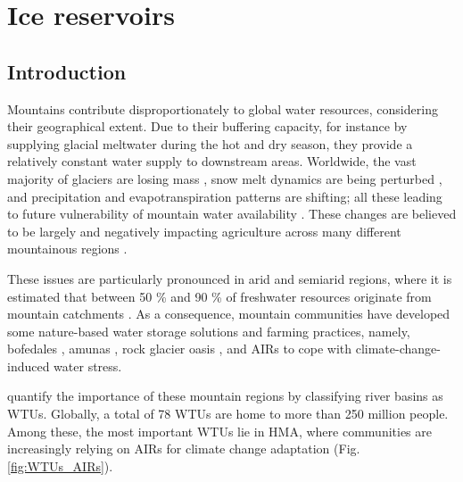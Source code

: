 \chapter{Ice reservoirs}



\section{Introduction}

Mountains contribute disproportionately to global water resources, considering their geographical extent.
Due to their buffering capacity, for instance by supplying glacial meltwater during the hot and dry season,
they provide a relatively constant water supply to downstream areas. Worldwide, the vast majority of glaciers
are losing mass \citep{zempGlobalGlacierMass2019a}, snow melt dynamics are being perturbed
\citep{mukhopadhyayReevaluationSnowmeltGlacial2015, hammondGlobalSnowZone2018}, and precipitation and
evapotranspiration patterns are shifting; all these leading to future vulnerability of mountain water availability
\citep{lutzConsistentIncreaseHigh2014}. These changes are believed to be largely and negatively
impacting agriculture across many different mountainous regions \citep{ipccCrossChapterPaperMountains2022}.

These issues are particularly pronounced in arid and semiarid regions, where it is estimated that between 50 \%
and 90 \% of freshwater resources originate from mountain catchments
\citep{mukhopadhyayReevaluationSnowmeltGlacial2015, messerliMountainsWorldVulnerable2004}. As a consequence,
mountain communities have developed some nature-based water storage solutions and farming practices, namely,
bofedales \citep{monge-salazarEcohydrologyEcosystemServices2022}, amunas
\citep{ochoa-tocachiPotentialContributionsPreInca2019}, rock glacier oasis \citep{pandeyRockGlacierOasis2022},
and \ac{AIRs} \citep{wangchukIceStupaCompetition2020} to cope with climate-change-induced water stress.

\citet{immerzeelImportanceVulnerabilityWorld2020} quantify the importance of these mountain regions by
classifying river basins as \ac{WTUs}. Globally, a total of 78 \ac{WTUs} are home to more than 250 million
people. Among these, the most important WTUs lie in \ac{HMA}, where communities are increasingly relying on
\ac{AIRs} for climate change adaptation (Fig. \ref{fig:WTUs_AIRs}). 

